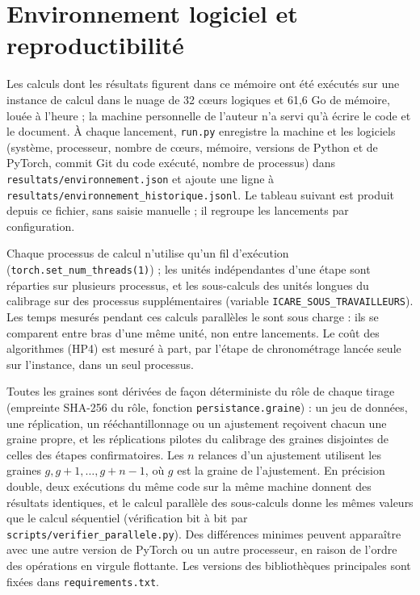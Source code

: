 \chapter{Environnement logiciel et reproductibilité}
Les calculs dont les résultats figurent dans ce mémoire ont été exécutés sur une instance de calcul dans le nuage de 32 cœurs logiques et 61,6 Go de mémoire, louée à l'heure ; la machine personnelle de l'auteur n'a servi qu'à écrire le code et le document. À chaque lancement, \texttt{run.py} enregistre la machine et les logiciels (système, processeur, nombre de cœurs, mémoire, versions de Python et de PyTorch, commit Git du code exécuté, nombre de processus) dans \texttt{resultats/environnement.json} et ajoute une ligne à \texttt{resultats/environnement\_historique.jsonl}. Le tableau suivant est produit depuis ce fichier, sans saisie manuelle ; il regroupe les lancements par configuration.


Chaque processus de calcul n'utilise qu'un fil d'exécution (\texttt{torch.set\_num\_threads(1)}) ; les unités indépendantes d'une étape sont réparties sur plusieurs processus, et les sous-calculs des unités longues du calibrage sur des processus supplémentaires (variable \texttt{ICARE\_SOUS\_TRAVAILLEURS}). Les temps mesurés pendant ces calculs parallèles le sont sous charge : ils se comparent entre bras d'une même unité, non entre lancements. Le coût des algorithmes (HP4) est mesuré à part, par l'étape de chronométrage lancée seule sur l'instance, dans un seul processus.

Toutes les graines sont dérivées de façon déterministe du rôle de chaque tirage (empreinte SHA-256 du rôle, fonction \texttt{persistance.graine}) : un jeu de données, une réplication, un rééchantillonnage ou un ajustement reçoivent chacun une graine propre, et les réplications pilotes du calibrage des graines disjointes de celles des étapes confirmatoires. Les $n$ relances d'un ajustement utilisent les graines $g, g+1, \dots, g+n-1$, où $g$ est la graine de l'ajustement. En précision double, deux exécutions du même code sur la même machine donnent des résultats identiques, et le calcul parallèle des sous-calculs donne les mêmes valeurs que le calcul séquentiel (vérification bit à bit par \texttt{scripts/verifier\_parallele.py}). Des différences minimes peuvent apparaître avec une autre version de PyTorch ou un autre processeur, en raison de l'ordre des opérations en virgule flottante. Les versions des bibliothèques principales sont fixées dans \texttt{requirements.txt}.

